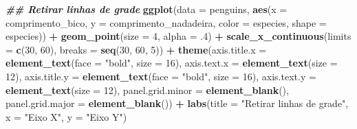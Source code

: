 \documentclass[
]{article}
\newenvironment{Shaded}{\begin{snugshade}}{\end{snugshade}}
\newcommand{\AttributeTok}[1]{\textcolor[rgb]{0.13,0.29,0.53}{#1}}
\newcommand{\DecValTok}[1]{\textcolor[rgb]{0.00,0.00,0.81}{#1}}
\newcommand{\DocumentationTok}[1]{\textcolor[rgb]{0.56,0.35,0.01}{\textbf{\textit{#1}}}}
\newcommand{\FunctionTok}[1]{\textcolor[rgb]{0.13,0.29,0.53}{\textbf{#1}}}
\newcommand{\NormalTok}[1]{#1}
\newcommand{\SpecialCharTok}[1]{\textcolor[rgb]{0.81,0.36,0.00}{\textbf{#1}}}
\newcommand{\StringTok}[1]{\textcolor[rgb]{0.31,0.60,0.02}{#1}}
\begin{document}
\begin{Shaded}
\begin{Highlighting}[]
\DocumentationTok{\#\# Retirar linhas de grade}
\FunctionTok{ggplot}\NormalTok{(}\AttributeTok{data =}\NormalTok{ penguins, }
       \FunctionTok{aes}\NormalTok{(}\AttributeTok{x =}\NormalTok{ comprimento\_bico, }\AttributeTok{y =}\NormalTok{ comprimento\_nadadeira,}
           \AttributeTok{color =}\NormalTok{ especies, }\AttributeTok{shape =}\NormalTok{ especies)) }\SpecialCharTok{+}
    \FunctionTok{geom\_point}\NormalTok{(}\AttributeTok{size =} \DecValTok{4}\NormalTok{, }\AttributeTok{alpha =}\NormalTok{ .}\DecValTok{4}\NormalTok{) }\SpecialCharTok{+}
    \FunctionTok{scale\_x\_continuous}\NormalTok{(}\AttributeTok{limits =} \FunctionTok{c}\NormalTok{(}\DecValTok{30}\NormalTok{, }\DecValTok{60}\NormalTok{), }\AttributeTok{breaks =} \FunctionTok{seq}\NormalTok{(}\DecValTok{30}\NormalTok{, }\DecValTok{60}\NormalTok{, }\DecValTok{5}\NormalTok{)) }\SpecialCharTok{+}
    \FunctionTok{theme}\NormalTok{(}\AttributeTok{axis.title.x =} \FunctionTok{element\_text}\NormalTok{(}\AttributeTok{face =} \StringTok{"bold"}\NormalTok{, }\AttributeTok{size =} \DecValTok{16}\NormalTok{),}
          \AttributeTok{axis.text.x =} \FunctionTok{element\_text}\NormalTok{(}\AttributeTok{size =} \DecValTok{12}\NormalTok{),}
          \AttributeTok{axis.title.y =} \FunctionTok{element\_text}\NormalTok{(}\AttributeTok{face =} \StringTok{"bold"}\NormalTok{, }\AttributeTok{size =} \DecValTok{16}\NormalTok{),}
          \AttributeTok{axis.text.y =} \FunctionTok{element\_text}\NormalTok{(}\AttributeTok{size =} \DecValTok{12}\NormalTok{),}
          \AttributeTok{panel.grid.minor =} \FunctionTok{element\_blank}\NormalTok{(),}
          \AttributeTok{panel.grid.major =} \FunctionTok{element\_blank}\NormalTok{()) }\SpecialCharTok{+}
    \FunctionTok{labs}\NormalTok{(}\AttributeTok{title =} \StringTok{"Retirar linhas de grade"}\NormalTok{, }\AttributeTok{x =} \StringTok{"Eixo X"}\NormalTok{, }\AttributeTok{y =} \StringTok{"Eixo Y"}\NormalTok{)}
\end{Highlighting}
\end{Shaded}
\end{document}
